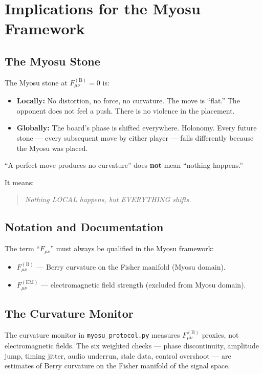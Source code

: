\documentclass[12pt,a4paper]{article}
\begin{document}
\section{Implications for the Myosu Framework}

\subsection{The Myosu Stone}

The Myosu stone at $F_{\mu\nu}^{(\mathrm{B})} = 0$ is:

\begin{itemize}[nosep]
    \item \textbf{Locally:} No distortion, no force, no curvature. The move is ``flat.'' The opponent does not feel a push. There is no violence in the placement.
    \item \textbf{Globally:} The board's phase is shifted everywhere. Holonomy. Every future stone — every subsequent move by either player — falls differently because the Myosu was placed.
\end{itemize}

\noindent``A perfect move produces no curvature'' does \textbf{not} mean ``nothing happens.''

It means:

\begin{quote}
\emph{Nothing LOCAL happens, but EVERYTHING shifts.}
\end{quote}

\subsection{Notation and Documentation}

The term ``$F_{\mu\nu}$'' must always be qualified in the Myosu framework:

\begin{itemize}[nosep]
    \item $F_{\mu\nu}^{(\mathrm{B})}$ — Berry curvature on the Fisher manifold (Myosu domain).
    \item $F_{\mu\nu}^{(\mathrm{EM})}$ — electromagnetic field strength (excluded from Myosu domain).
\end{itemize}

\subsection{The Curvature Monitor}

The curvature monitor in \texttt{myosu\_protocol.py} measures $F_{\mu\nu}^{(\mathrm{B})}$ proxies, not electromagnetic fields. The six weighted checks — phase discontinuity, amplitude jump, timing jitter, audio underrun, stale data, control overshoot — are estimates of Berry curvature on the Fisher manifold of the signal space.
\end{document}
